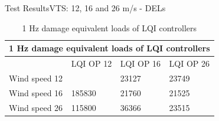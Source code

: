 \begin{frame}{Test Results}{VTS: 12, 16 and 26 m/s - DELs}
	
	\begin{table}[ht]
		\centering
		\caption{1 Hz damage equivalent loads of LQI controllers}
		\label{tab:del_lqi}
		\begin{tabular}{@{}|llll|@{}}
			\toprule
			\multicolumn{4}{|c|}{1 Hz damage equivalent loads of LQI controllers}                                                                                                                                \\ \midrule
			\multicolumn{1}{|l|}{}              & \multicolumn{1}{l|}{LQI OP 12}                                            & \multicolumn{1}{l|}{LQI OP 16}                     & LQI OP 26                     \\ \midrule
			\multicolumn{1}{|l|}{Wind speed 12} & \multicolumn{1}{l|}{\cellcolor[HTML]{FFCCC9}{\color[HTML]{333333} 24132}} & \multicolumn{1}{l|}{\cellcolor[HTML]{9AFF99}23127} & 23749                         \\ \midrule
			\multicolumn{1}{|l|}{Wind speed 16} & \multicolumn{1}{l|}{\cellcolor[HTML]{FFCCC9}185830}                       & \multicolumn{1}{l|}{21760}                         & \cellcolor[HTML]{9AFF99}21525 \\ \midrule
			\multicolumn{1}{|l|}{Wind speed 26} & \multicolumn{1}{l|}{\cellcolor[HTML]{FFCCC9}115800}                       & \multicolumn{1}{l|}{36366}                         & \cellcolor[HTML]{9AFF99}23515 \\ \bottomrule
		\end{tabular}
	\end{table}
	
\end{frame}


